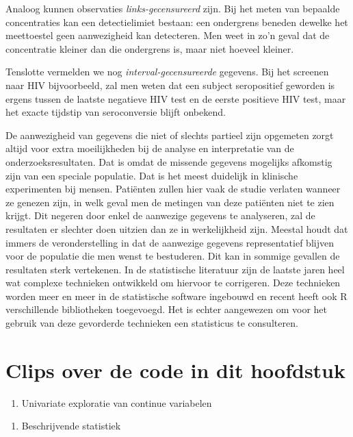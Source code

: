 \documentclass[
  12pt,dutch,coursenotes]{book}
\providecommand{\tightlist}{%
  \setlength{\itemsep}{0pt}\setlength{\parskip}{0pt}}
\begin{document}
Analoog kunnen observaties \emph{links-gecensureerd} zijn. Bij het meten
van bepaalde concentraties kan een detectielimiet bestaan: een ondergrens beneden
dewelke het meettoestel geen aanwezigheid kan detecteren. Men weet in zo'n
geval dat de concentratie kleiner dan die ondergrens is, maar niet hoeveel
kleiner.

Tenslotte vermelden we nog \emph{interval-gecensureerde} gegevens. Bij het
screenen naar HIV bijvoorbeeld, zal men weten dat een subject seropositief
geworden is ergens tussen de laatste negatieve HIV test en de eerste
positieve HIV test, maar het exacte tijdstip van seroconversie blijft
onbekend.

De aanwezigheid van gegevens die niet of slechts partieel zijn opgemeten zorgt
altijd voor extra moeilijkheden bij de analyse en interpretatie van de
onderzoeksresultaten. Dat is omdat de missende gegevens mogelijks afkomstig zijn
van een speciale populatie. Dat is het meest duidelijk in klinische experimenten bij mensen.
Patiënten zullen hier vaak de studie verlaten wanneer
ze genezen zijn, in welk geval men de metingen van deze patiënten niet te
zien krijgt. Dit negeren door enkel de aanwezige gegevens te analyseren, zal
de resultaten er slechter doen uitzien dan ze in werkelijkheid zijn. Meestal
houdt dat immers de veronderstelling in dat de aanwezige gegevens representatief blijven
voor de populatie die men wenst te bestuderen. Dit kan in sommige gevallen
de resultaten sterk vertekenen. In de statistische literatuur zijn de
laatste jaren heel wat complexe technieken ontwikkeld om hiervoor te
corrigeren. Deze technieken worden meer en meer in de statistische software
ingebouwd en recent heeft ook R verschillende bibliotheken toegevoegd.
Het is
echter aangewezen om voor het gebruik van deze gevorderde technieken een
statisticus te consulteren.

\hypertarget{clips-over-de-code-in-dit-hoofdstuk}{%
\section{Clips over de code in dit hoofdstuk}\label{clips-over-de-code-in-dit-hoofdstuk}}

\begin{enumerate}
\def\labelenumi{\arabic{enumi}.}
\tightlist
\item
  Univariate exploratie van continue variabelen
\end{enumerate}

\begin{enumerate}
\def\labelenumi{\arabic{enumi}.}
\setcounter{enumi}{1}
\tightlist
\item
  Beschrijvende statistiek
\end{enumerate}
\end{document}
